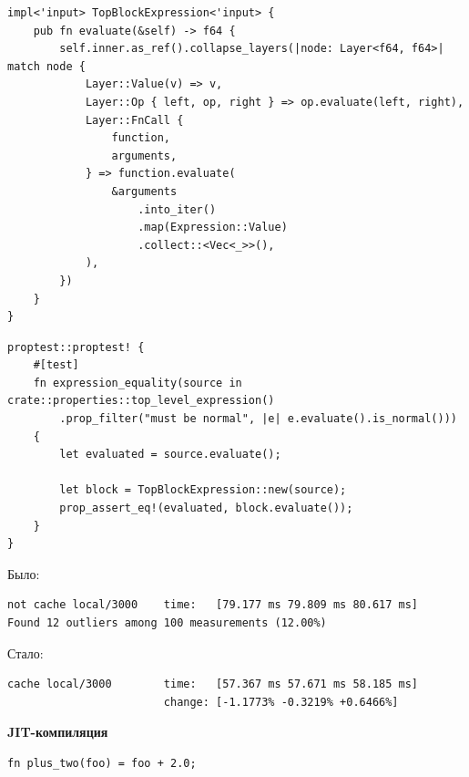 \begin{frame}[fragile]
    \begin{verbatim}
impl<'input> TopBlockExpression<'input> {
    pub fn evaluate(&self) -> f64 {
        self.inner.as_ref().collapse_layers(|node: Layer<f64, f64>| match node {
            Layer::Value(v) => v,
            Layer::Op { left, op, right } => op.evaluate(left, right),
            Layer::FnCall {
                function,
                arguments,
            } => function.evaluate(
                &arguments
                    .into_iter()
                    .map(Expression::Value)
                    .collect::<Vec<_>>(),
            ),
        })
    }
}
    \end{verbatim}
\end{frame}

\begin{frame}[fragile]
    \begin{verbatim}
proptest::proptest! {
    #[test]
    fn expression_equality(source in crate::properties::top_level_expression()
        .prop_filter("must be normal", |e| e.evaluate().is_normal()))
    {
        let evaluated = source.evaluate();

        let block = TopBlockExpression::new(source);
        prop_assert_eq!(evaluated, block.evaluate());
    }
}
    \end{verbatim}
\end{frame}

\begin{frame}[fragile]
    Было:
    \begin{lstlisting}[basicstyle=\fontsize{10pt}{12}\bf\ttfamily\color{black}]
not cache local/3000    time:   [79.177 ms 79.809 ms 80.617 ms]
Found 12 outliers among 100 measurements (12.00%)
    \end{lstlisting}
    \hfill \break
    \hfill \break
    Стало:
    \begin{lstlisting}[basicstyle=\fontsize{10pt}{12}\bf\ttfamily\color{black}]
cache local/3000        time:   [57.367 ms 57.671 ms 58.185 ms]
                        change: [-1.1773% -0.3219% +0.6466%]
    \end{lstlisting}
\end{frame}

\begin{frame}[fragile]
  \textbf{JIT-компиляция}
\end{frame}

\begin{frame}[fragile]
    \begin{verbatim}
fn plus_two(foo) = foo + 2.0;
    \end{verbatim}
\end{frame}

